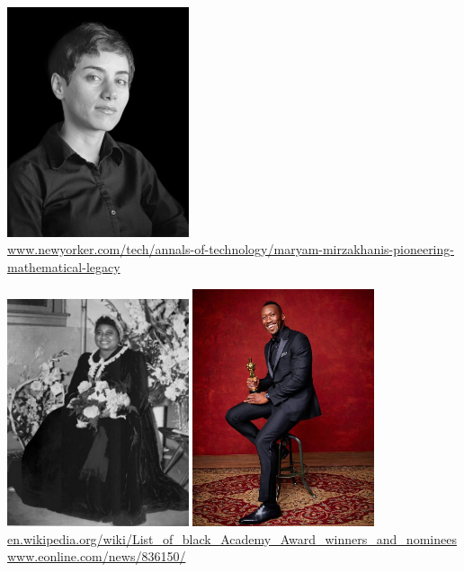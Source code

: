 \documentclass{beamer}
\begin{document}
\begin{frame}
    \begin{center}
    \includegraphics[width=0.4\textwidth]{static/maryam.jpg} \\
    \vspace{.8cm}
    \tiny{\url{www.newyorker.com/tech/annals-of-technology/maryam-mirzakhanis-pioneering-mathematical-legacy}}

    \end{center}
\end{frame}

\begin{frame}
    \begin{center}
    \includegraphics[width=0.40\textwidth]{static/hattie.jpg} \hspace{10pt}
    \includegraphics[width=0.40\textwidth, height=.505\textwidth]{static/ali.jpg}
    \vspace{.8cm}
    \tiny{\url{en.wikipedia.org/wiki/List_of_black_Academy_Award_winners_and_nominees} \url{www.eonline.com/news/836150/}}

    \end{center}
\end{frame}
\end{document}
